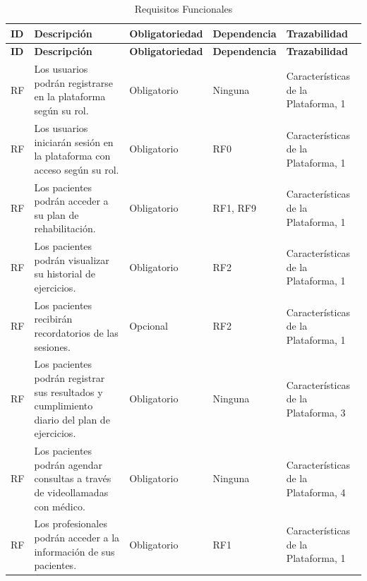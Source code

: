 \documentclass{article}
\begin{document}
	
\begin{longtable}{@{} p{1.5cm} p{5cm} p{3cm} p{2cm} p{3cm} @{}}
	\caption{Requisitos Funcionales}\\
	\toprule
	\textbf{ID} & \textbf{Descripción} & \textbf{Obligatoriedad} & \textbf{Dependencia} & \textbf{Trazabilidad} \\
	\midrule
	\endfirsthead
	
	\toprule
	\textbf{ID} & \textbf{Descripción} & \textbf{Obligatoriedad} & \textbf{Dependencia} & \textbf{Trazabilidad} \\
	\midrule
	\endhead
	
	\addlinespace 
	RF\therequisitosFuncionales & Los usuarios podrán registrarse en la plataforma según su rol. & Obligatorio & Ninguna & Características de la Plataforma, 1  \\
	\addlinespace \stepcounter{requisitosFuncionales}
	RF\therequisitosFuncionales & Los usuarios iniciarán sesión en la plataforma con acceso según su rol. & Obligatorio & RF0 & Características de la Plataforma, 1 \\  
	\addlinespace \stepcounter{requisitosFuncionales}
	RF\therequisitosFuncionales & Los pacientes podrán acceder a su plan de rehabilitación. & Obligatorio & RF1, RF9 & Características de la Plataforma, 1 \\ 
	\addlinespace \stepcounter{requisitosFuncionales}
	RF\therequisitosFuncionales & Los pacientes podrán visualizar su historial de ejercicios. & Obligatorio & RF2 & Características de la Plataforma, 1 \\ 
	\addlinespace \stepcounter{requisitosFuncionales}
	RF\therequisitosFuncionales & Los pacientes recibirán recordatorios de las sesiones. & Opcional & RF2 & Características de la Plataforma, 1 \\
	\addlinespace \stepcounter{requisitosFuncionales}
	RF\therequisitosFuncionales & Los pacientes podrán registrar sus resultados y cumplimiento diario del plan de ejercicios. & Obligatorio & Ninguna & Características de la Plataforma, 3 \\ 
	\addlinespace \stepcounter{requisitosFuncionales}
	RF\therequisitosFuncionales & Los pacientes podrán agendar consultas a través de videollamadas con médico. & Obligatorio & Ninguna & Características de la Plataforma, 4 \\
	\addlinespace \stepcounter{requisitosFuncionales}
	RF\therequisitosFuncionales & Los profesionales podrán acceder a la información de sus pacientes. & Obligatorio & RF1 & Características de la Plataforma, 1 \\ 

\end{longtable}
\end{document}
